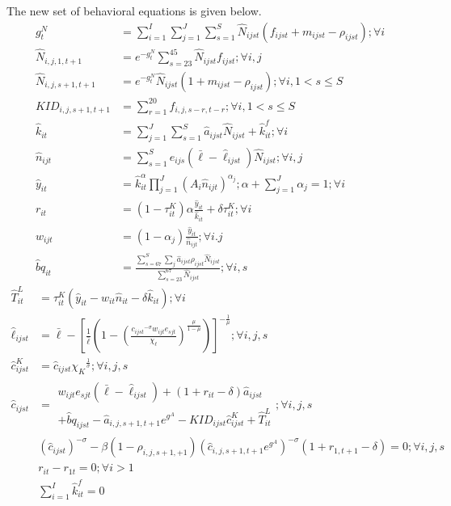 \documentclass[letterpaper,12pt]{article}
\theoremstyle{definition}
\numberwithin{equation}{section}
\begin{document}
\begin{spacing}{1.5}
	The new set of behavioral equations is given below.
	\begin{align}
		g^N_t & = \sum_{i=1}^I \sum_{j=1}^J \sum_{s=1}^S \hat N_{ijst} (f_{ijst}+m_{ijst}-\rho_{ijst}) ; \forall i\\
		\hat N_{i,j,1,t+1} & = e^{-g^N_t}\sum_{s=23}^{45} \hat N_{ijst} f_{ijst} ; \forall i,j\\
		\hat N_{i,j,s+1,t+1} & = e^{-g^N_t}\hat N_{ijst} (1+m_{ijst}-\rho_{ijst}); \forall i, 1<s\le S \\
		KID_{i,j,s+1,t+1} & = \sum_{r=1}^{20} f_{i,j,s-r,t-r}; \forall i, 1<s\le S \\
	    \hat k_{it} & = \sum_{j=1}^J \sum_{s=1}^S \hat a_{ijst} \hat N_{ijst} + \hat k_{it}^f; \forall i \\
		\hat n_{ijt} & = \sum_{s=1}^S e_{ijs} (\bar \ell - \hat \ell_{ijst}) \hat N_{ijst}; \forall i,j \\
		\hat y_{it} & = \hat k_{it}^\alpha \prod_{j=1}^J \left( A_{i} \hat n_{ijt} \right)^{\alpha_j}; \alpha + \sum_{j=1}^J \alpha_j = 1 ; \forall i \\
		r_{it} & = (1-\tau^K_{it})\alpha \frac{\hat y_{it}}{\hat k_{it}} + \delta \tau^K_{it}; \forall i \\
		w_{ijt} & = (1-\alpha_j) \frac{\hat y_{it}}{\hat n_{ijt}}; \forall i.j \\
		\hat bq_{it} & = \frac{\sum_{s=67}^S \sum_j \hat a_{ijst} \rho_{ijst} \hat N_{ijst}}{\sum_{s=23}^{67} \hat N_{ijst}} ; \forall i,s
	\end{align}
	\begin{align}
		\hat T^L_{it} & = \tau^K_{it} (\hat y_{it} - w_{it}\hat n_{it} - \delta \hat k_{it}); \forall i \\
    	\hat \ell_{ijst} & = \bar \ell -  \left[ \frac{1}{\bar \ell} \left( 1-\left(\frac{{c_{ijst}}^{-\sigma} w_{ijt} e_{sjt}}{\chi_\ell} \right)^{\frac{\mu}{1-\mu}} \right) \right]^{-\frac{1}{\mu}}; \forall i,j,s \label{eq_6elldef} \\
		\hat c^K_{ijst} & = \hat c_{ijst} {\chi_K}^{\frac{1}{\sigma}}; \forall i,j,s \label{eq_6cKdef} \\
		\hat c_{ijst} & = \begin{matrix} w_{ijt} e_{sjt} (\bar \ell - \hat \ell_{ijst}) + (1+r_{it}-\delta)\hat a_{ijst} \\ +\hat bq_{ijst} - \hat a_{i,j,s+1,t+1} e^{g^A} - {KID}_{ijst} \hat c^K_{ijst} + \hat T^L_{it} \end{matrix}; \forall i,j,s \label{eq_6BC} \\
		& \left({\hat c_{ijst}}\right)^{-\sigma} - \beta (1-\rho_{i,j,s+1,+1}) \left(\hat c_{i,j,s+1,t+1} e^{g^A}\right)^{-\sigma}(1+r_{1,t+1}-\delta) = 0; \forall i,j,s \\
		& r_{it} - r_{1t} = 0; \forall i>1 \\
		& \sum_{i=1}^I \hat k^f_{it} = 0
	\end{align}

\end{spacing}

\newpage

\end{document}
